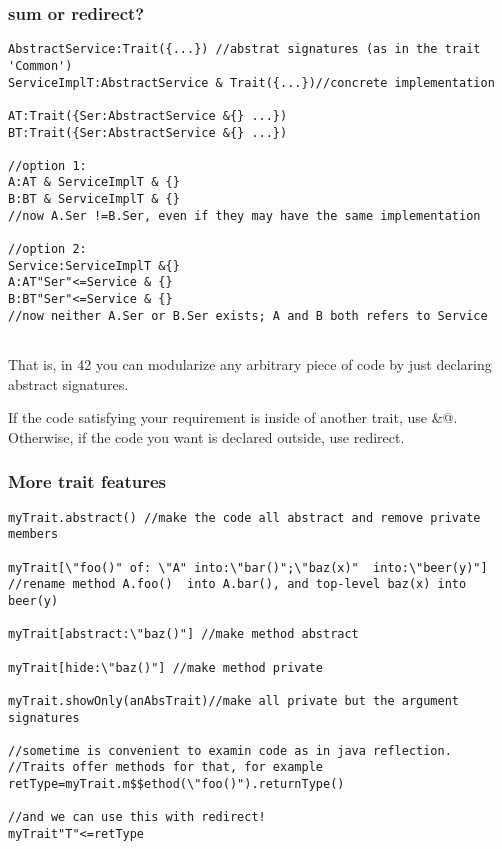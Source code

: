 \begin{frame}[fragile]
\frametitle{ sum or redirect?}
\begin{NiceCode}{59ex}{0.7}
\begin{lstlisting}
AbstractService:Trait({...}) //abstrat signatures (as in the trait 'Common')
ServiceImplT:AbstractService & Trait({...})//concrete implementation

AT:Trait({Ser:AbstractService &{} ...})
BT:Trait({Ser:AbstractService &{} ...})

//option 1:
A:AT & ServiceImplT & {}
B:BT & ServiceImplT & {}
//now A.Ser !=B.Ser, even if they may have the same implementation

//option 2:
Service:ServiceImplT &{}
A:AT"Ser"<=Service & {}
B:BT"Ser"<=Service & {}
//now neither A.Ser or B.Ser exists; A and B both refers to Service 


\end{lstlisting}
\end{NiceCode}
That is, in 42 you can modularize any arbitrary piece of code by
just declaring abstract signatures.


If the code satisfying your requirement is inside of another trait, use \Q@&@.
Otherwise, if the code you want is declared outside, use redirect. 


\end{frame}

\begin{frame}[fragile]
\frametitle{More trait features}
\begin{NiceCode}{59ex}{0.7}
\begin{lstlisting}
myTrait.abstract() //make the code all abstract and remove private members

myTrait[\"foo()" of: \"A" into:\"bar()";\"baz(x)"  into:\"beer(y)"]
//rename method A.foo()  into A.bar(), and top-level baz(x) into beer(y)

myTrait[abstract:\"baz()"] //make method abstract

myTrait[hide:\"baz()"] //make method private

myTrait.showOnly(anAbsTrait)//make all private but the argument signatures

//sometime is convenient to examin code as in java reflection.
//Traits offer methods for that, for example
retType=myTrait.m$$ethod(\"foo()").returnType()

//and we can use this with redirect!
myTrait"T"<=retType

\end{lstlisting}
\end{NiceCode}
\end{frame}


